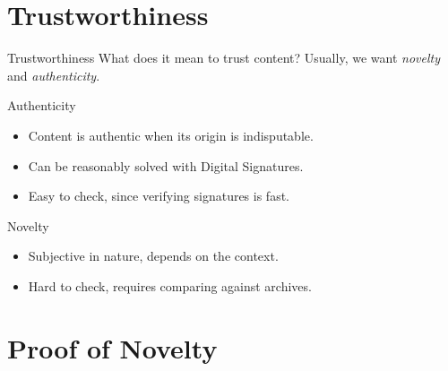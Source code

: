 \documentclass{beamer}
\begin{document}
\section{Trustworthiness}
\begin{frame}{Trustworthiness}
    What does it mean to trust content? \pause Usually, we want \emph{novelty} and \emph{authenticity}.
    \vfill
    \pause
    \begin{block}{Authenticity}
        \pause
        \begin{itemize}
            \item Content is authentic when its origin is indisputable.\pause
            \item Can be reasonably solved with Digital Signatures.\pause
            \item Easy to check, since verifying signatures is fast.
        \end{itemize}
    \end{block}
    
    \vfill
    
    \pause
    \begin{block}{Novelty}
        \pause
        \begin{itemize}
            \item Subjective in nature, depends on the context.\pause
            \item Hard to check, requires comparing against archives.
        \end{itemize}
    \end{block}
\end{frame}

\section{Proof of Novelty}
\end{document}
